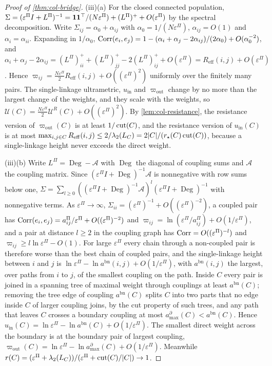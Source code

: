\begin{proof}[Proof of \cref{thm:col-bridge}]
(iii)(a) For the closed connected population, $\Sigma=(\varepsilon^\Pi I+L^\Pi)^{-1}=\mathbf{1}\mathbf{1}^\top/(N\varepsilon^\Pi)+(L^\Pi)^++O(\varepsilon^\Pi)$ by the spectral decomposition. Write $\Sigma_{ij}=\alpha_0+\alpha_{ij}$ with $\alpha_0=1/(N\varepsilon^\Pi)$, $\alpha_{ij}=O(1)$ and $\alpha_i=\alpha_{ii}$. Expanding in $1/\alpha_0$, $\operatorname{Corr}(e_i,e_j)=1-(\alpha_i+\alpha_j-2\alpha_{ij})/(2\alpha_0)+O(\alpha_0^{-2})$, and $\alpha_i+\alpha_j-2\alpha_{ij}=(L^\Pi)^+_{ii}+(L^\Pi)^+_{jj}-2(L^\Pi)^+_{ij}+O(\varepsilon^\Pi)=R_{\mathrm{eff}}(i,j)+O(\varepsilon^\Pi)$. Hence $\varpi_{ij}=\frac{N\varepsilon^\Pi}2R_{\mathrm{eff}}(i,j)+O((\varepsilon^\Pi)^2)$ uniformly over the finitely many pairs. The single-linkage ultrametric, $u_{\mathrm{in}}$ and $\varpi_{\mathrm{out}}$ change by no more than the largest change of the weights, and they scale with the weights, so $\mathcal U(C)=\frac{N\varepsilon^\Pi}2\mathcal U^R(C)+O((\varepsilon^\Pi)^2)$. By \cref{lem:col-resistance}, the resistance version of $\varpi_{\mathrm{out}}(C)$ is at least $1/\operatorname{cut}(C)$, and the resistance version of $u_{\mathrm{in}}(C)$ is at most $\max_{i,j\in C}R_{\mathrm{eff}}(i,j)\le2/\lambda_2(L_C)=2|C|/(r_\star(C)\operatorname{cut}(C))$, because a single-linkage height never exceeds the direct weight.

(iii)(b) Write $L^\Pi=\operatorname{Deg}-\mathcal A$ with $\operatorname{Deg}$ the diagonal of coupling sums and $\mathcal A$ the coupling matrix. Since $(\varepsilon^\Pi I+\operatorname{Deg})^{-1}\mathcal A$ is nonnegative with row sums below one, $\Sigma=\sum_{l\ge0}((\varepsilon^\Pi I+\operatorname{Deg})^{-1}\mathcal A)^l(\varepsilon^\Pi I+\operatorname{Deg})^{-1}$ with nonnegative terms. As $\varepsilon^\Pi\to\infty$, $\Sigma_{ii}=(\varepsilon^\Pi)^{-1}+O((\varepsilon^\Pi)^{-2})$, a coupled pair has $\operatorname{Corr}(e_i,e_j)=a^\Pi_{ij}/\varepsilon^\Pi+O((\varepsilon^\Pi)^{-2})$ and $\varpi_{ij}=\ln(\varepsilon^\Pi/a^\Pi_{ij})+O(1/\varepsilon^\Pi)$, and a pair at distance $l\ge2$ in the coupling graph has $\operatorname{Corr}=O((\varepsilon^\Pi)^{-l})$ and $\varpi_{ij}\ge l\ln\varepsilon^\Pi-O(1)$. For large $\varepsilon^\Pi$ every chain through a non-coupled pair is therefore worse than the best chain of coupled pairs, and the single-linkage height between $i$ and $j$ is $\ln\varepsilon^\Pi-\ln a^{\mathrm{bn}}(i,j)+O(1/\varepsilon^\Pi)$, with $a^{\mathrm{bn}}(i,j)$ the largest, over paths from $i$ to $j$, of the smallest coupling on the path. Inside $C$ every pair is joined in a spanning tree of maximal weight through couplings at least $a^{\mathrm{bn}}(C)$; removing the tree edge of coupling $a^{\mathrm{bn}}(C)$ splits $C$ into two parts that no edge inside $C$ of larger coupling joins, by the cut property of such trees, and any path that leaves $C$ crosses a boundary coupling at most $a^\partial_{\max}(C)<a^{\mathrm{bn}}(C)$. Hence $u_{\mathrm{in}}(C)=\ln\varepsilon^\Pi-\ln a^{\mathrm{bn}}(C)+O(1/\varepsilon^\Pi)$. The smallest direct weight across the boundary is at the boundary pair of largest coupling, $\varpi_{\mathrm{out}}(C)=\ln\varepsilon^\Pi-\ln a^\partial_{\max}(C)+O(1/\varepsilon^\Pi)$. Meanwhile $r(C)=(\varepsilon^\Pi+\lambda_2(L_C))/(\varepsilon^\Pi+\operatorname{cut}(C)/|C|)\to1$.


\end{proof}
